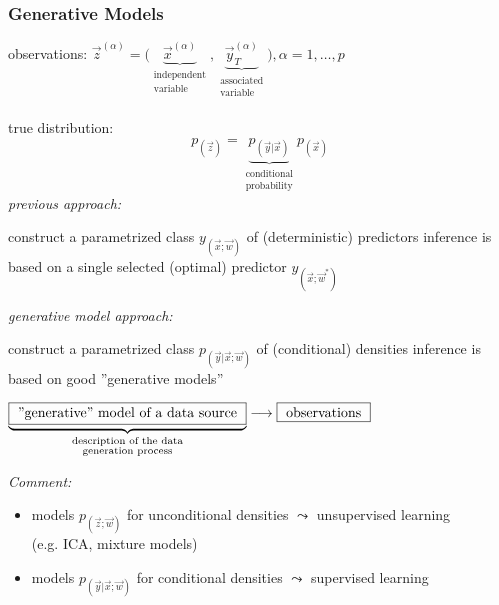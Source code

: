 \subsubsection{Generative Models}
observations: $\vec{z}^{(\alpha)} = \big( \underbrace{ \vec{x}^{(\alpha)} }_{
	\substack{ \text{independent} \\ \text{variable} }}, 
	\underbrace{ \vec{y}_T^{(\alpha)} }_{ \substack{ \text{associated} \\
		\text{variable}} } \big), \alpha = 1, \ldots, p$
\\\\
true distribution:
\begin{equation}
	p_{(\vec{z})} = \underbrace{p_{(\vec{y} | \vec{x})}}_{
		\substack{ \text{conditional} \\ \text{probability} }}
	p_{(\vec{x})}
\end{equation}
\emph{previous approach:}
\begin{itemize}
	\itl construct a parametrized class $y_{(\vec{x};\vec{w})}$ of 
		(deterministic) predictors
	\itl inference is based on a single selected (optimal) predictor 
		$y_{(\vec{x}; \vec{w}^*)}$
\end{itemize}
\emph{generative model approach:}
\begin{itemize}
	\itl construct a parametrized class $p_{(\vec{y}|\vec{x};\vec{w})}$
		of (conditional) densities
	\itl inference is based on good ''generative models''
\end{itemize}
\begin{center}
$\underbrace{ \fbox{ \text{''generative'' model of a data source} } 
	}_{ \substack{
		\text{description of the data} \\
		\text{generation process} }}
\longrightarrow \fbox{ \text{observations} }$
\end{center}
\emph{Comment:}
\begin{itemize}
	\item[] models $p_{(\vec{z};\vec{w})}$ for unconditional densities
		$\leadsto$ unsupervised learning 
		\\ (e.g. ICA, mixture models)
	\item[] models $p_{(\vec{y}|\vec{x};\vec{w})}$ for conditional 
		densities $\leadsto$ supervised learning
\end{itemize}
